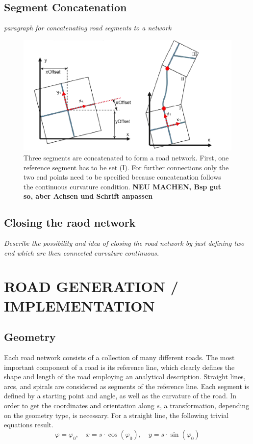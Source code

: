 \documentclass[a4paper, 10pt, conference]{ieeeconf}      %
\begin{document}
\subsection{Segment Concatenation}
\textit{paragraph for concatenating road segments to a network}
\begin{figure}[thpb] 		
	\centering
	\includegraphics[width=0.9\columnwidth]{fig/concatSegments.png}
	\caption{Three segments are concatenated to form a road network. First, one reference segment has to be set (I). For further connections only the two end points need to be specified because concatenation follows the continuous curvature condition. \textbf{NEU MACHEN, Bsp gut so, aber Achsen und Schrift anpassen}}
	\label{fig_concatSeg}
\end{figure}

\subsection{Closing the raod network}
\textit{Describe the possibility and idea of closing the road network by just defining two end which are then connected curvature continuous.}
\section{ROAD GENERATION / IMPLEMENTATION}

\subsection{Geometry}
    Each road network consists of a collection of many different roads. The most important component of a road is its reference line, which clearly defines the shape and length of the road employing an analytical description. Straight lines, arcs, and spirals are considered as segments of the reference line. Each segment is defined by a starting point and angle, as well as the curvature of the road. In order to get the coordinates and orientation along \(s\), a transformation, depending on the geometry type, is necessary. For a straight line, the following trivial equations result.
    \begin{equation}
        \varphi = \varphi_0, \quad x = s \cdot \cos(\varphi_0), \quad y = s \cdot \sin(\varphi_0)
    \end{equation}
\end{document}
